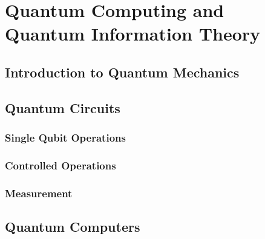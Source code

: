 \chapter{Quantum Computing and Quantum Information Theory}\label{chap:QCaQIT}


\section{Introduction to Quantum Mechanics}\label{sec:IntroQM}

\section{Quantum Circuits}\label{sec:QuantumCircuits}


\subsection{Single Qubit Operations}\label{sec:SQO}

\subsection{Controlled Operations}\label{sec:ControlledOperations}

\subsection{Measurement}\label{sec:Measurement}


\section{Quantum Computers}\label{sec:QuantumCircuits}



